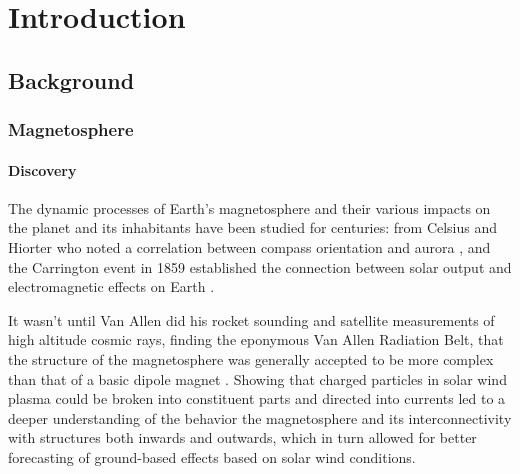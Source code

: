 

\chapter[Introduction]{Introduction}

\section{Background}

\subsection{Magnetosphere}

\subsubsection{Discovery}
The dynamic processes of Earth's magnetosphere and their various impacts on the planet and its inhabitants have been studied for centuries: from Celsius and Hiorter who noted a correlation between compass orientation and aurora \cite{Maunder}, and the Carrington event in 1859 established the connection between solar output and electromagnetic effects on Earth \cite{Carrington}. 

It wasn't until Van Allen did his rocket sounding and satellite measurements of high altitude cosmic rays, finding the eponymous Van Allen Radiation Belt, that the structure of the magnetosphere was generally accepted to be more complex than that of a basic dipole magnet \cite{MagnetoHistory}. Showing that charged particles in solar wind plasma could be broken into constituent parts and directed into currents led to a deeper understanding of the behavior the magnetosphere and its interconnectivity with structures both inwards and outwards, which in turn allowed for better forecasting of ground-based effects based on solar wind conditions.

